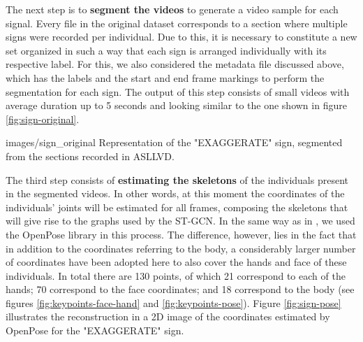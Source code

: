
The next step is to \textbf{segment the videos} to generate a video sample for each signal. Every file in the original dataset corresponds to a section where multiple signs were recorded per individual. Due to this, it is necessary to constitute a new set organized in such a way that each sign is arranged individually with its respective label. For this, we also considered the metadata file discussed above, which has the labels and the start and end frame markings to perform the segmentation for each sign. The output of this step consists of small videos with average duration up to 5 seconds and looking similar to the one shown in figure \ref{fig:sign-original}.


    {images/sign_original}
    {Representation of the "EXAGGERATE" sign, segmented from the sections recorded in ASLLVD.}

The third step consists of \textbf{estimating the skeletons} of the individuals present in the segmented videos. In other words, at this moment the coordinates of the individuals' joints will be estimated for all frames, composing the skeletons that will give rise to the graphs used by the ST-GCN. In the same way as in \cite {st-gcn-2018}, we used the OpenPose library in this process. The difference, however, lies in the fact that in addition to the coordinates referring to the body, a considerably larger number of coordinates have been adopted here to also cover the hands and face of these individuals. In total there are 130 points, of which 21 correspond to each of the hands; 70 correspond to the face coordinates; and 18 correspond to the body (see figures \ref{fig:keypoints-face-hand} and \ref{fig:keypoints-pose}). Figure \ref{fig:sign-pose} illustrates the reconstruction in a 2D image of the coordinates estimated by OpenPose for the "EXAGGERATE" sign.

